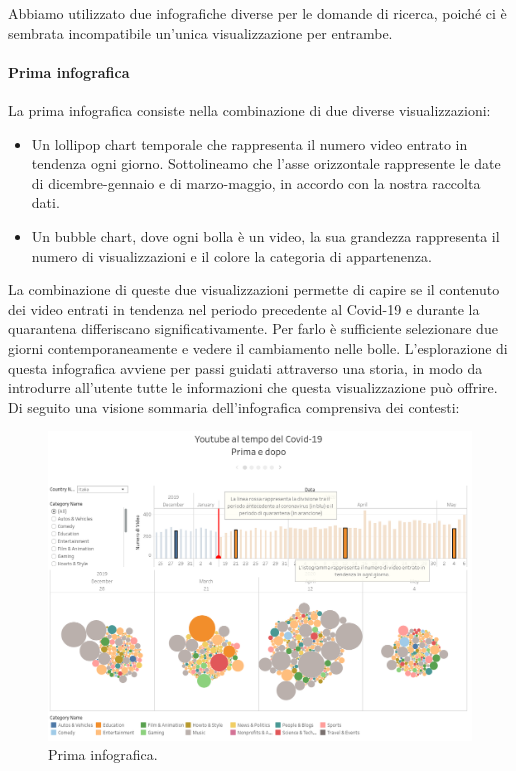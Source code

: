 \documentclass[10pt, a4paper,openany]{article}
\begin{document}
Abbiamo utilizzato due infografiche diverse per le domande di ricerca, poiché ci è sembrata incompatibile un'unica visualizzazione per entrambe.


\paragraph{Prima infografica} La prima infografica consiste nella combinazione di due diverse visualizzazioni:
\begin{itemize}
	\item Un lollipop chart temporale che rappresenta il numero video entrato in tendenza ogni giorno. Sottolineamo che l'asse orizzontale rappresente le date di dicembre-gennaio e di marzo-maggio, in accordo con la nostra raccolta dati.
	\item Un bubble chart, dove ogni bolla è un video, la sua grandezza rappresenta il numero di visualizzazioni e il colore la categoria di appartenenza.
\end{itemize}

La combinazione di queste due visualizzazioni permette di capire se il contenuto dei video entrati in tendenza nel periodo precedente al Covid-19 e  durante la quarantena differiscano significativamente. Per farlo è sufficiente selezionare due giorni contemporaneamente e vedere il cambiamento nelle bolle. L'esplorazione di questa infografica avviene per passi guidati attraverso una storia, in modo da introdurre all'utente tutte le informazioni che questa visualizzazione può offrire. Di seguito una visione sommaria dell'infografica comprensiva dei contesti:
\begin{figure}[H]
	\centering
	\includegraphics[height=0.5 \linewidth]{pics/prima_infografica.png}
	\caption{Prima infografica.}
\end{figure}
\end{document}
